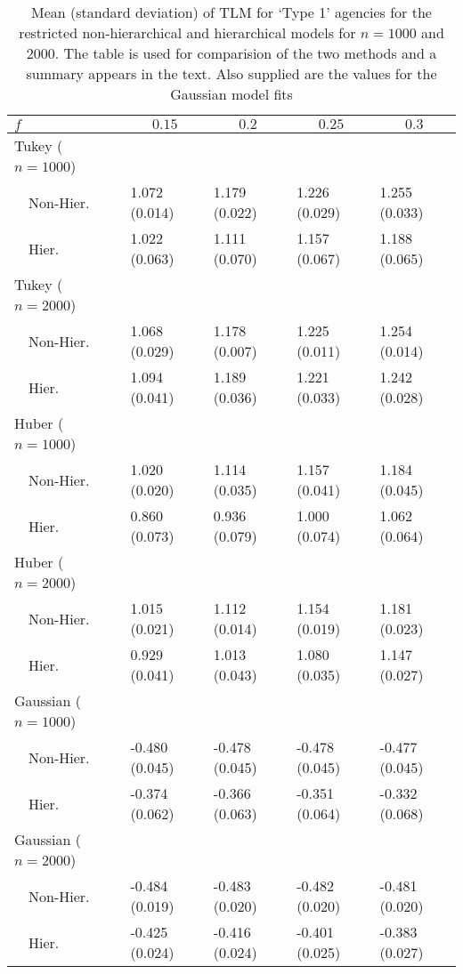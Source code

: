 \begin{table}[!tbp]
{\small
\begin{center}
\begin{tabular}{lllll}
\hline\hline
\multicolumn{1}{l}{$f$}&\multicolumn{1}{c}{$0.15$}&\multicolumn{1}{c}{$0.2$}&\multicolumn{1}{c}{$0.25$}&\multicolumn{1}{c}{$0.3$}\tabularnewline
\hline
{\mdseries Tukey ($n=1000$)}&&&&\tabularnewline
~~Non-Hier.&1.072 (0.014)&1.179 (0.022)&1.226 (0.029)&1.255 (0.033)\tabularnewline
~~Hier.&1.022 (0.063)&1.111 (0.070)&1.157 (0.067)&1.188 (0.065)\tabularnewline
\hline
{\mdseries Tukey ($n=2000$) }&&&&\tabularnewline
~~Non-Hier.&1.068 (0.029)&1.178 (0.007)&1.225 (0.011)&1.254 (0.014)\tabularnewline
~~Hier.&1.094 (0.041)&1.189 (0.036)&1.221 (0.033)&1.242 (0.028)\tabularnewline
\hline
{\mdseries Huber  ($n=1000$)}&&&&\tabularnewline
~~Non-Hier.&1.020 (0.020)&1.114 (0.035)&1.157 (0.041)&1.184 (0.045)\tabularnewline
~~Hier.&0.860 (0.073)&0.936 (0.079)&1.000 (0.074)&1.062 (0.064)\tabularnewline
\hline
{\mdseries Huber ($n=2000$)}&&&&\tabularnewline
~~Non-Hier.&1.015 (0.021)&1.112 (0.014)&1.154 (0.019)&1.181 (0.023)\tabularnewline
~~Hier.&0.929 (0.041)&1.013 (0.043)&1.080 (0.035)&1.147 (0.027)\tabularnewline
\hline
{\mdseries Gaussian  ($n=1000$)}&&&&\tabularnewline
~~Non-Hier.&-0.480 (0.045)&-0.478 (0.045)&-0.478 (0.045)&-0.477 (0.045)\tabularnewline
~~Hier.&-0.374 (0.062)&-0.366 (0.063)&-0.351 (0.064)&-0.332 (0.068)\tabularnewline
\hline
{\mdseries Gaussian ($n=2000$)}&&&&\tabularnewline
~~Non-Hier.&-0.484 (0.019)&-0.483 (0.020)&-0.482 (0.020)&-0.481 (0.020)\tabularnewline
~~Hier.&-0.425 (0.024)&-0.416 (0.024)&-0.401 (0.025)&-0.383 (0.027)\tabularnewline
\hline
\end{tabular}

\caption{Mean (standard deviation) of TLM for `Type 1' agencies for the restricted non-hierarchical and hierarchical models for $n=1000$ and $2000$. The table is used for comparision of the two methods and a summary appears in the text. Also supplied are the values for the Gaussian model fits\label{tlmTableWithGaus}}\end{center}}

\end{table}
